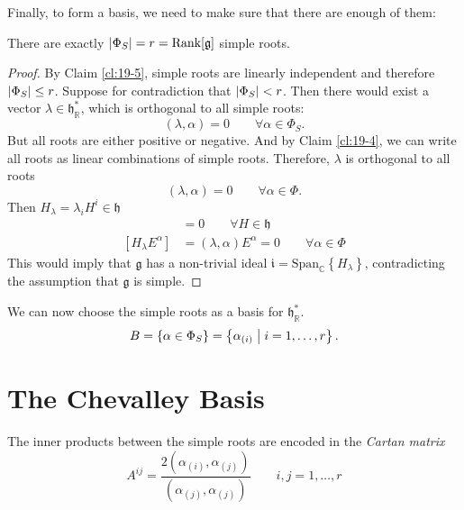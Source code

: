 Finally, to form a basis, we need to make sure that there are enough of them:
\begin{claim}
  There are exactly $\abs{\Phi_S} = r = \text{Rank}[\mathfrak{g}]$ simple roots.
\end{claim}
\begin{proof}
  By Claim \ref{cl:19-5}, simple roots are linearly independent and therefore $\abs{\Phi_S} \leq r$.
  Suppose for contradiction that $\abs{\Phi_S} < r$. Then there would exist a vector $\lambda \in \mathfrak{h}^*_\mathbb{R}$, which is orthogonal to all simple roots:
  \begin{equation}
    (\lambda, \alpha) = 0 \qquad \forall \alpha \in \Phi_S.
  \end{equation}
  But all roots are either positive or negative. And by Claim \ref{cl:19-4}, we can write all roots as linear combinations of simple roots. Therefore, $\lambda$ is orthogonal to all roots
  \begin{equation}
    (\lambda, \alpha) = 0 \qquad \forall \alpha \in \Phi.
  \end{equation}
  Then $H_{\lambda} = \lambda_{i} H^{i} \in \mathfrak{h}$
  \begin{align}
    [H_{\lambda}, H] &= 0 \qquad \forall H \in \mathfrak{h} \\
    [H_{\lambda} E^{\alpha}] &= (\lambda, \alpha) E^{\alpha}  = 0 \qquad \forall \alpha \in \Phi
  \end{align}
  This would imply that $\mathfrak{g}$ has a non-trivial ideal $\mathfrak{i} = \text{Span}_{\mathbb{C}}\left\{H_{\lambda}\right\}$, contradicting the assumption that $\mathfrak{g}$ is simple.
\end{proof}

\begin{corollary}
  We can now choose the simple roots as a basis for $\mathfrak{h}^*_{\mathbb{R}}$.
  \begin{equation}
    B = \left\{ \alpha \in \Phi_S \right\} = \left\{ \alpha_{(i)} \suchthat i = 1, \dots, r \right\}.
  \end{equation}
\end{corollary}

\section{The Chevalley Basis}%
\label{sec:chevalley_basis}

\begin{definition}[]
  The inner products between the simple roots are encoded in the \emph{Cartan matrix}
  \begin{equation}
    \boxed{A^{ij} = \frac{2(\alpha_{(i)}, \alpha_{(j)})}{(\alpha_{(j)}, \alpha_{(j)})}} \qquad i,j = 1, \dots, r
  \end{equation}
\end{definition}

